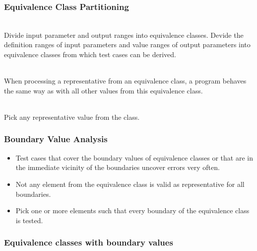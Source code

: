 
\begin{frame}
\frametitle{Equivalence Class Partitioning}
\\
Divide input parameter and output  ranges into equivalence classes.
Devide the definition ranges of input parameters and value ranges of output parameters into equivalence classes from which test cases can be derived.
 
\vspace{\baselineskip}
\\
When processing a representative from an equivalence class, a program behaves the same way as with all other values from this equivalence class.
 
\vspace{\baselineskip}
\\
Pick any representative value from the class.
\end{frame}




\begin{frame}
\frametitle{Boundary Value Analysis}
\begin{itemize}
  \item Test cases that cover the boundary values of equivalence classes or that are in the immediate vicinity of the boundaries uncover errors very often.
  \item Not any element from the equivalence class is valid as representative for all boundaries.
  \item Pick one or more elements such that every boundary of the equivalence class is tested.
\end{itemize}
\end{frame}


\begin{frame}
\frametitle{Equivalence classes with boundary values}
\begin{center}
\end{center}
\end{frame}

